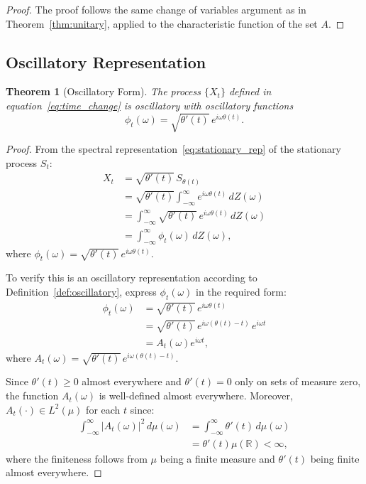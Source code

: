 \documentclass[11pt]{article}
\newtheorem{theorem}{Theorem}
\begin{document}
\begin{proof}
The proof follows the same change of variables argument as in Theorem~\ref{thm:unitary}, applied to the characteristic function of the set $A$.
\end{proof}

\subsection{Oscillatory Representation}

\begin{theorem}[Oscillatory Form]\label{thm:osc_rep}
The process $\{X_t\}$ defined in equation~\eqref{eq:time_change} is oscillatory with oscillatory functions
\begin{equation}\label{eq:phi_def}
    \phi_t(\omega)=\sqrt{\theta'(t)}\,e^{i\omega\theta(t)}.
\end{equation}
\end{theorem}

\begin{proof}
From the spectral representation~\eqref{eq:stationary_rep} of the stationary process $S_t$:
\begin{align}
    X_t &= \sqrt{\theta'(t)}\,S_{\theta(t)}\\
    &= \sqrt{\theta'(t)}\int_{-\infty}^{\infty}e^{i\omega\theta(t)}\,dZ(\omega)\\
    &= \int_{-\infty}^{\infty}\sqrt{\theta'(t)}\,e^{i\omega\theta(t)}\,dZ(\omega)\\
    &= \int_{-\infty}^{\infty}\phi_t(\omega)\,dZ(\omega),
\end{align}
where $\phi_t(\omega) = \sqrt{\theta'(t)}\,e^{i\omega\theta(t)}$.

To verify this is an oscillatory representation according to Definition~\ref{def:oscillatory}, express $\phi_t(\omega)$ in the required form:
\begin{align}
    \phi_t(\omega) &= \sqrt{\theta'(t)}\,e^{i\omega\theta(t)}\\
    &= \sqrt{\theta'(t)}\,e^{i\omega(\theta(t)-t)}\,e^{i\omega t}\\
    &= A_t(\omega)e^{i\omega t},
\end{align}
where $A_t(\omega) = \sqrt{\theta'(t)}\,e^{i\omega(\theta(t)-t)}$.

Since $\theta'(t) \geq 0$ almost everywhere and $\theta'(t) = 0$ only on sets of measure zero, the function $A_t(\omega)$ is well-defined almost everywhere. Moreover, $A_t(\cdot)\in L^2(\mu)$ for each $t$ since:
\begin{align}
    \int_{-\infty}^{\infty}\lvert A_t(\omega)\rvert^2\,d\mu(\omega) &= \int_{-\infty}^{\infty}\theta'(t)\,d\mu(\omega)\\
    &= \theta'(t)\mu(\mathbb{R}) < \infty,
\end{align}
where the finiteness follows from $\mu$ being a finite measure and $\theta'(t)$ being finite almost everywhere.
\end{proof}
\end{document}
